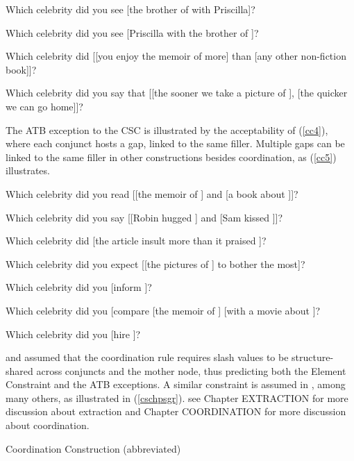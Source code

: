 \documentclass[output=paper]{langsci/langscibook}
\begin{document}
\ea 
\ea Which celebrity did you see [the brother of \spc with Priscilla]?
\item Which celebrity did you see [Priscilla with the brother of \spc]?
\z \label{cc3} 
\z

\ea 
\ea Which celebrity did  [[you enjoy the memoir of \spcs more] than
                                 [any other non-fiction book]]?

\item Which celebrity did you say that [[the sooner we take a picture of \spc ],
[the quicker we can go home]]?
\z \label{compar} 
\z


The ATB exception to the CSC is illustrated by the acceptability of (\ref{cc4}), where each conjunct hosts a gap, linked to the same filler. Multiple gaps can be linked to the same filler in other constructions besides  coordination, as  (\ref{cc5}) illustrates. 

\ea \label{cc4}
\ea Which celebrity did you read  [[the memoir of \spc] and [a  book about \spc]]?
\item Which celebrity did you say [[Robin hugged  \spc] and [Sam kissed \spc]]?
\z
\z 

\ea 
\ea Which celebrity did  [the article insult \spc more than it praised \spc]?
\item  Which celebrity  did you expect [[the pictures of \spc ] to bother \spc the most]?
\item  Which celebrity did you [inform ]?
\item  Which celebrity did you [compare [the memoir of \spc] [with a movie about \spc]?
\item  Which celebrity  did you [hire ]?
\z \label{cc5}
\z 


\citet{gazdar} and \citet{gpsg} assumed that the coordination rule  requires {\sc slash} values to be structure-shared across conjuncts and the mother node, thus  predicting  both the Element Constraint and the ATB exceptions. A similar constraint is assumed in \citet[202]{pollardsag}
\citet[60]{Beavers}, among many others, as illustrated in (\ref{cschpsgr}). see Chapter EXTRACTION for more discussion about extraction and Chapter COORDINATION for more discussion about coordination. 


\ea
{\sc Coordination Construction} (abbreviated)
\end{document}
